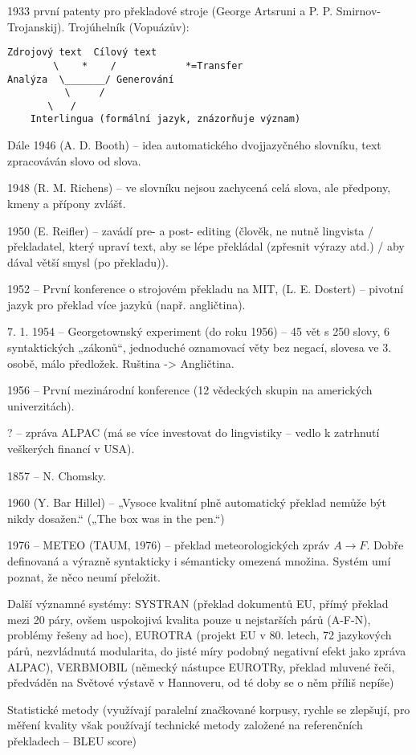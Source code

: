 \documentclass[12pt]{article}					%
\begin{document}
\begin{poznamka}[Prehistorie]
	1933 první patenty pro překladové stroje (George Artsruni a P. P. Smirnov-Trojanskij). Trojúhelník (Vopuázův):
\begin{verbatim}
Zdrojový text  Cílový text
        \    *    /            *=Transfer
Analýza  \_______/ Generování
          \     /
	   \   /
	Interlingua (formální jazyk, znázorňuje význam)
\end{verbatim}

	Dále 1946 (A. D. Booth) – idea automatického dvojjazyčného slovníku, text zpracováván slovo od slova.

	1948 (R. M. Richens) – ve slovníku nejsou zachycená celá slova, ale předpony, kmeny a přípony zvlášť.

	1950 (E. Reifler) – zavádí pre- a post- editing (člověk, ne nutně lingvista / překladatel, který upraví text, aby se lépe překládal (zpřesnit výrazy atd.) / aby dával větší smysl (po překladu)).

	1952 – První konference o strojovém překladu na MIT, (L. E. Dostert) – pivotní jazyk pro překlad více jazyků (např. angličtina).

	7. 1. 1954 – Georgetownský experiment (do roku 1956) – 45 vět s 250 slovy, 6 syntaktických „zákonů“, jednoduché oznamovací věty bez negací, slovesa ve 3. osobě, málo předložek. Ruština -> Angličtina.

	1956 – První mezinárodní konference (12 vědeckých skupin na amerických univerzitách).

	? – zpráva ALPAC (má se více investovat do lingvistiky – vedlo k zatrhnutí veškerých financí v USA).

	1857 – N. Chomsky.

	1960 (Y. Bar Hillel) – „Vysoce kvalitní plně automatický překlad nemůže být nikdy dosažen.“ („The box was in the pen.“)

	1976 – METEO (TAUM, 1976) – překlad meteorologických zpráv $A \to  F$. Dobře definovaná a výrazně syntakticky i sémanticky omezená množina. Systém umí poznat, že něco neumí přeložit.

	Další významné systémy: SYSTRAN (překlad dokumentů EU, přímý překlad mezi 20 páry, ovšem uspokojivá kvalita pouze u nejstarších párů (A-F-N), problémy řešeny ad hoc), EUROTRA (projekt EU v 80. letech, 72 jazykových párů, nezvládnutá modularita, do jisté míry podobný negativní efekt jako zpráva ALPAC), VERBMOBIL (německý nástupce EUROTRy, překlad mluvené řeči, předváděn na Světové výstavě v Hannoveru, od té doby se o něm příliš nepíše)
\end{poznamka}

\begin{poznamka}
	Statistické metody (využívají paralelní značkované korpusy, rychle se zlepšují, pro měření kvality však používají technické metody založené na referenčních překladech – BLEU score)
\end{poznamka}
\end{document}
